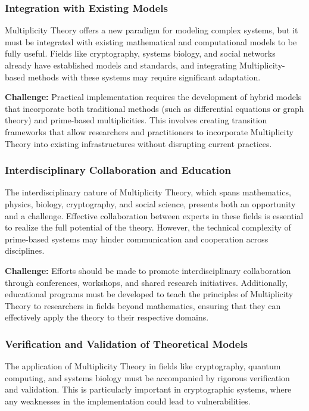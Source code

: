 \documentclass[%
 preprint, linenumbers,
 amsmath,amssymb,
 aps, physrev,
]{revtex4-2}
\begin{document}
\subsubsection{Integration with Existing Models}
Multiplicity Theory offers a new paradigm for modeling complex systems, but it must be integrated with existing mathematical and computational models to be fully useful. Fields like cryptography, systems biology, and social networks already have established models and standards, and integrating Multiplicity-based methods with these systems may require significant adaptation.

\textbf{Challenge:} Practical implementation requires the development of hybrid models that incorporate both traditional methods (such as differential equations or graph theory) and prime-based multiplicities. This involves creating transition frameworks that allow researchers and practitioners to incorporate Multiplicity Theory into existing infrastructures without disrupting current practices.

\subsubsection{Interdisciplinary Collaboration and Education}
The interdisciplinary nature of Multiplicity Theory, which spans mathematics, physics, biology, cryptography, and social science, presents both an opportunity and a challenge. Effective collaboration between experts in these fields is essential to realize the full potential of the theory. However, the technical complexity of prime-based systems may hinder communication and cooperation across disciplines.

\textbf{Challenge:} Efforts should be made to promote interdisciplinary collaboration through conferences, workshops, and shared research initiatives. Additionally, educational programs must be developed to teach the principles of Multiplicity Theory to researchers in fields beyond mathematics, ensuring that they can effectively apply the theory to their respective domains.

\subsubsection{Verification and Validation of Theoretical Models}
The application of Multiplicity Theory in fields like cryptography, quantum computing, and systems biology must be accompanied by rigorous verification and validation. This is particularly important in cryptographic systems, where any weaknesses in the implementation could lead to vulnerabilities.
\end{document}
